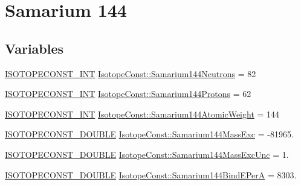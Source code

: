 \hypertarget{group___isotope_const-_samarium-_sm144}{}\section{Samarium 144}
\label{group___isotope_const-_samarium-_sm144}
\subsection*{Variables}
\begin{DoxyCompactItemize}
\item 
\mbox{\hyperlink{group___isotope_const-_macros_ga5f18360b3e99483a35c32d789e62621c}{I\+S\+O\+T\+O\+P\+E\+C\+O\+N\+S\+T\+\_\+\+I\+NT}} \mbox{\hyperlink{group___isotope_const-_samarium-_sm144_ga1a59ca388e85da222f2d884f12c5cef4}{Isotope\+Const\+::\+Samarium144\+Neutrons}} = 82
\item 
\mbox{\hyperlink{group___isotope_const-_macros_ga5f18360b3e99483a35c32d789e62621c}{I\+S\+O\+T\+O\+P\+E\+C\+O\+N\+S\+T\+\_\+\+I\+NT}} \mbox{\hyperlink{group___isotope_const-_samarium-_sm144_ga1f2f44d7cf23cf98a6dbb2819481db60}{Isotope\+Const\+::\+Samarium144\+Protons}} = 62
\item 
\mbox{\hyperlink{group___isotope_const-_macros_ga5f18360b3e99483a35c32d789e62621c}{I\+S\+O\+T\+O\+P\+E\+C\+O\+N\+S\+T\+\_\+\+I\+NT}} \mbox{\hyperlink{group___isotope_const-_samarium-_sm144_ga36c1860d3a86cd8863dc6983ff2bdd6f}{Isotope\+Const\+::\+Samarium144\+Atomic\+Weight}} = 144
\item 
\mbox{\hyperlink{group___isotope_const-_macros_ga8f45a7272ce02c0b4c65c44636ed719a}{I\+S\+O\+T\+O\+P\+E\+C\+O\+N\+S\+T\+\_\+\+D\+O\+U\+B\+LE}} \mbox{\hyperlink{group___isotope_const-_samarium-_sm144_gadcbb1aac81a3cf0262b153f72c2b6975}{Isotope\+Const\+::\+Samarium144\+Mass\+Exc}} = -\/81965.
\item 
\mbox{\hyperlink{group___isotope_const-_macros_ga8f45a7272ce02c0b4c65c44636ed719a}{I\+S\+O\+T\+O\+P\+E\+C\+O\+N\+S\+T\+\_\+\+D\+O\+U\+B\+LE}} \mbox{\hyperlink{group___isotope_const-_samarium-_sm144_ga82d81409899e659f23214b805f4ff55e}{Isotope\+Const\+::\+Samarium144\+Mass\+Exc\+Unc}} = 1.
\item 
\mbox{\hyperlink{group___isotope_const-_macros_ga8f45a7272ce02c0b4c65c44636ed719a}{I\+S\+O\+T\+O\+P\+E\+C\+O\+N\+S\+T\+\_\+\+D\+O\+U\+B\+LE}} \mbox{\hyperlink{group___isotope_const-_samarium-_sm144_ga17b76c5c526101c918751b6f15fde2f4}{Isotope\+Const\+::\+Samarium144\+Bind\+E\+PerA}} = 8303.
\item 

\end{DoxyCompactItemize}
